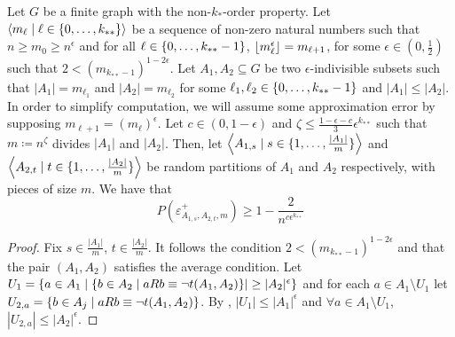     \begin{lemma}[Claim 4.13] \label{lem:bound_on_the_probability_of_a_subpair_having_no_exceptions}
        Let $G$ be a finite graph with the non-$k_{*}$-order property.
        Let $\left< m_\ell \mid \ell \in \{ 0, \dots, k_{**} \} \right>$ be a sequence of non-zero natural numbers such that
        $n \geq m_0 \geq n^\epsilon$  and for all $\ell \in \{ 0, \dots, k_{**}-1 \}$, $\left\lfloor m_\ell^\epsilon \right\rfloor = m_{\ell+1}$,
        for some $\epsilon \in (0, \frac{1}{2})$ such that $2 < (m_{k_{**}-1})^{1-2\epsilon}$.
        Let $A_1, A_2 \subseteq G$ be two $\epsilon$-indivisible subsets such that $|A_1| = m_{\ell_1}$ and $|A_2| = m_{\ell_2}$
        for some $\ell_1, \ell_2 \in \{ 0, \dots, k_{**}-1 \}$ and $|A_1| \leq |A_2|$.
        In order to simplify computation, we will assume some approximation error by supposing $m_{\ell+1} = (m_{\ell})^\epsilon$.
        Let $c \in (0, 1-\epsilon)$ and $\zeta \leq \frac{1 - \epsilon - c}{3}\epsilon^{k_{**}}$ such that
        $m \coloneqq n^\zeta$ divides $|A_1|$ and $|A_2|$.
        Then, let $\left< A_{1,s} \mid s \in \{ 1, \dots, \frac{|A_1|}{m} \} \right>$ and
        $\left< A_{2,t} \mid t \in \{ 1, \dots, \frac{|A_2|}{m} \} \right>$ be random partitions of $A_1$ and $A_2$
        respectively, with pieces of size $m$.
        We have that
        \[
            P(\varepsilon^+_{A_{1,s},A_{2,t},m}) \geq 1 - \frac{2}{n^{c\epsilon^{k_{**}}}}
        \]
        \begin{proof}
            Fix $s \in \frac{|A_1|}{m}$, $t \in \frac{|A_2|}{m}$.
            It follows the condition $2 < (m_{k_{**}-1})^{1-2\epsilon}$ and 
            that the pair $(A_{1}, A_{2})$ satisfies the average condition.
            Let $U_1 = \{ a \in A_1 \mid \{ b \in A_2 \mid a R b \equiv \neg t(A_1, A_2) \}| \geq |A_2|^\epsilon \}$
            and for each $a \in A_1 \setminus U_1$ let $U_{2,a} = \{ b \in A_j \mid a R b \equiv \neg t(A_1, A_2) \}$.
            By , $|U_1| \leq |A_1|^\epsilon$ and $\forall a \in A_1 \setminus U_1$,
            $|U_{2,a}| \leq |A_2|^\epsilon$.

\end{proof}
\end{lemma}
